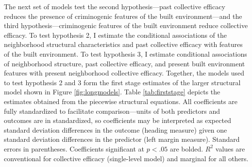 \documentclass [11pt, proquest] {uwthesis}[2015/03/03]
\begin{document}
The next set of models test the second hypothesis---past collective efficacy reduces the presence of criminogenic features of the built environment---and the third hypothesis---criminogenic features of the built environment reduce collective efficacy. To test hypothesis 2, I estimate the conditional associations of the neighborhood structural characteristics and past collective efficacy with features of the built environment. To test hypothesis 3, I estimate conditional associations of neighborhood structure, past collective efficacy, and present built environment features with present neighborhood collective efficacy. Together, the models used to test hypothesis 2 and 3 form the first stage estimates of the larger structural model shown in Figure \ref{fig:longmodels}. Table \ref{tab:firststage} depicts the estimates obtained from the piecewise structural equations. All coefficients are fully standardized to facilitate comparison---units of both predictors and outcomes are in standardized, so coefficients may be interpreted as expected standard deviation differences in the outcome (heading measure) given one standard deviation differences in the predictor (left margin measure). Standard errors in parentheses. Coefficients significant at \(p < .05\) are bolded. \(R^{2}\) values are conventional for collective efficacy (single-level model) and marginal for all others.

\clearpage
\providecommand{\docline}[3]{\noalign{\global\setlength{\arrayrulewidth}{#1}}\arrayrulecolor[HTML]{#2}\cline{#3}}

\setlength{\tabcolsep}{4pt}
\end{document}
